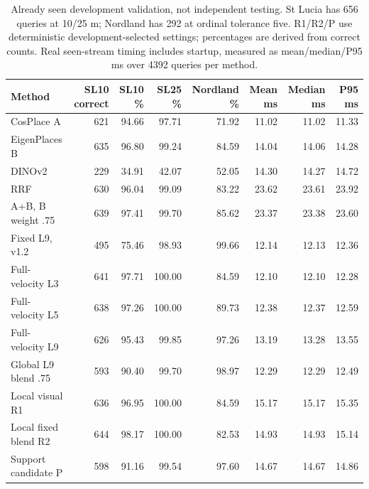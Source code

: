 \documentclass[conference]{IEEEtran}
\begin{document}
\begin{table}[!t]\centering\small
\caption{Already seen development validation, not independent testing. St Lucia has 656 queries at 10/25 m; Nordland has 292 at ordinal tolerance five. R1/R2/P use deterministic development-selected settings; percentages are derived from correct counts. Real seen-stream timing includes startup, measured as mean/median/P95 ms over 4392 queries per method.}\label{tab:main}
\begin{tabular}{lrrrrrrr}\toprule
Method & SL10 correct & SL10 \% & SL25 \% & Nordland \%  & Mean ms & Median ms & P95 ms\\\midrule
CosPlace A & 621 & 94.66 & 97.71 & 71.92 & 11.02 & 11.02 & 11.33\\
EigenPlaces B & 635 & 96.80 & 99.24 & 84.59 & 14.04 & 14.06 & 14.28\\
DINOv2 & 229 & 34.91 & 42.07 & 52.05 & 14.30 & 14.27 & 14.72\\
RRF & 630 & 96.04 & 99.09 & 83.22 & 23.62 & 23.61 & 23.92\\
A+B, B weight .75 & 639 & 97.41 & 99.70 & 85.62 & 23.37 & 23.38 & 23.60\\
Fixed L9, v1.2 & 495 & 75.46 & 98.93 & 99.66 & 12.14 & 12.13 & 12.36\\
Full-velocity L3 & 641 & 97.71 & 100.00 & 84.59 & 12.10 & 12.10 & 12.28\\
Full-velocity L5 & 638 & 97.26 & 100.00 & 89.73 & 12.38 & 12.37 & 12.59\\
Full-velocity L9 & 626 & 95.43 & 99.85 & 97.26 & 13.19 & 13.28 & 13.55\\
Global L9 blend .75 & 593 & 90.40 & 99.70 & 98.97 & 12.29 & 12.29 & 12.49\\
Local visual R1 & 636 & 96.95 & 100.00 & 84.59 & 15.17 & 15.17 & 15.35\\
Local fixed blend R2 & 644 & 98.17 & 100.00 & 82.53 & 14.93 & 14.93 & 15.14\\
Support candidate P & 598 & 91.16 & 99.54 & 97.60 & 14.67 & 14.67 & 14.86\\
\bottomrule\end{tabular}\end{table}
\end{document}
